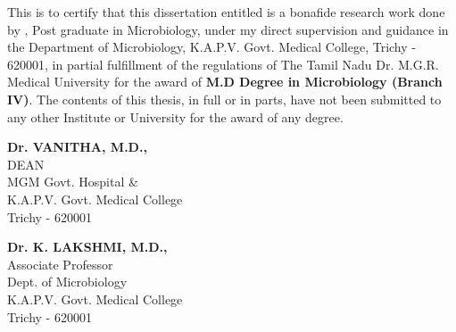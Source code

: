 \certificate

\vspace*{0.5in}

\noindent This is to certify that this dissertation entitled \textbf {\MyTitle} is a bonafide research work done by \textbf{\MyAuthor}, Post graduate in Microbiology, under my direct supervision and guidance in the Department of Microbiology, K.A.P.V. Govt. Medical College, Trichy - 620001, in partial fulfillment of the regulations of The Tamil Nadu Dr. M.G.R. Medical University for the award of \textbf {M.D Degree in Microbiology (Branch IV)}. The contents of this thesis, in full or in parts, have not been submitted to any other Institute or University for the award of any degree.


\vspace*{1.0in}

\begin{singlespacing}
\hspace*{-0.25in}
\parbox{2.5in}{
	\noindent \textbf{Dr. VANITHA, M.D.,} \\
	\noindent DEAN \\ %
	\noindent MGM Govt. Hospital \& \\
	\noindent K.A.P.V. Govt. Medical College \\
	\noindent Trichy - 620001 \\
}
\hspace*{1.0in}
\parbox{2.5in}{
	\noindent \textbf{Dr. K. LAKSHMI, M.D.,} \\
	\noindent Associate Professor \\ 
	\noindent Dept. of Microbiology \\
	\noindent K.A.P.V. Govt. Medical College\\
	\noindent Trichy - 620001 \\
}
\end{singlespacing}

 
